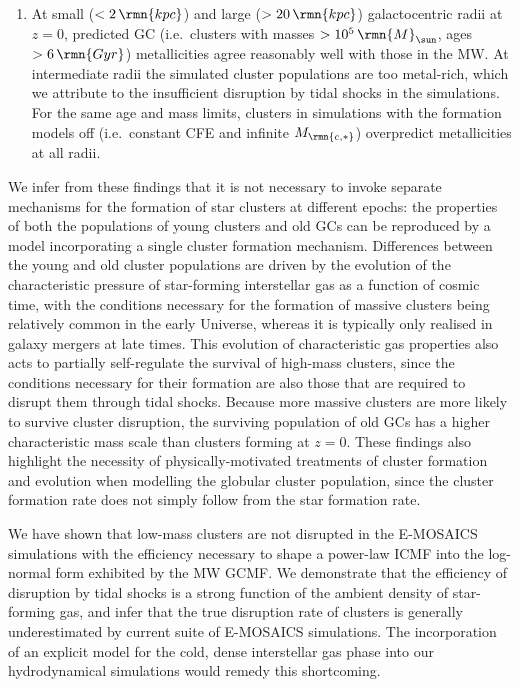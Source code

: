 \documentclass[fleqn,usenatbib]{mnras}
\newcommand\Msun{\,\rmn{M}_{\sun}}
\newcommand\Gyr{\,\rmn{Gyr}}
\newcommand\kpc{\,\rmn{kpc}}
\newcommand{\Mcstar}{M_\rmn{c,\ast}}
\begin{document}
\begin{enumerate}
\item At small ($<2 \kpc$) and large ($>20\kpc$) galactocentric radii at $z=0$, predicted GC (i.e.~clusters with masses $>10^5 \Msun$, ages $>6 \Gyr$) metallicities agree reasonably well with those in the MW. At intermediate radii the simulated cluster populations are too metal-rich, which we attribute to the insufficient disruption by tidal shocks in the simulations. For the same age and mass limits, clusters in simulations with the formation models off (i.e.~constant CFE and infinite $\Mcstar$) overpredict metallicities at all radii.
\end{enumerate}

We infer from these findings that it is not necessary to invoke separate mechanisms for the formation of star clusters at different epochs: the properties of both the populations of young clusters and old GCs can be reproduced by a model incorporating a single cluster formation mechanism. Differences between the young and old cluster populations are driven by the evolution of the characteristic pressure of star-forming interstellar gas as a function of cosmic time, with the conditions necessary for the formation of massive clusters being relatively common in the early Universe, whereas it is typically only realised in galaxy mergers at late times. This evolution of characteristic gas properties also acts to partially self-regulate the survival of high-mass clusters, since the conditions necessary for their formation are also those that are required to disrupt them through tidal shocks. Because more massive clusters are more likely to survive cluster disruption, the surviving population of old GCs has a higher characteristic mass scale than clusters forming at $z=0$. These findings also highlight the necessity of physically-motivated treatments of cluster formation and evolution when modelling the globular cluster population, since the cluster formation rate does not simply follow from the star formation rate.

We have shown that low-mass clusters are not disrupted in the E-MOSAICS simulations with the efficiency necessary to shape a power-law ICMF into the log-normal form exhibited by the MW GCMF. We demonstrate that the efficiency of disruption by tidal shocks is a strong function of the ambient density of star-forming gas, and infer that the true disruption rate of clusters is generally underestimated by current suite of E-MOSAICS simulations. The incorporation of an explicit model for the cold, dense interstellar gas phase into our hydrodynamical simulations would remedy this shortcoming. 
\end{document}
